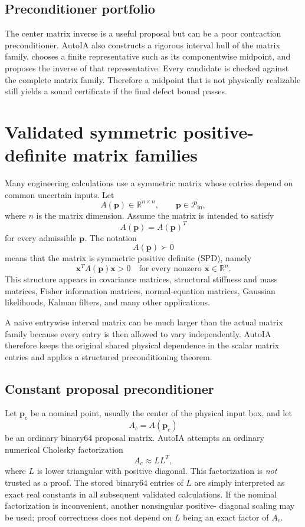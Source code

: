 \documentclass[11pt]{article}
\newcommand{\R}{\mathbb{R}}
\newcommand{\Pin}{\mathcal{P}_{\mathrm{in}}}
\newcommand{\pv}{\mathbf{p}}
\newcommand{\xv}{\mathbf{x}}
\begin{document}
\subsection{Preconditioner portfolio}

The center matrix inverse is a useful proposal but can be a poor contraction
preconditioner.  AutoIA also constructs a rigorous interval hull of the matrix
family, chooses a finite representative such as its componentwise midpoint, and
proposes the inverse of that representative.  Every candidate is checked against
the complete matrix family.  Therefore a midpoint that is not physically
realizable still yields a sound certificate if the final defect bound passes.

\section{Validated symmetric positive-definite matrix families}

Many engineering calculations use a symmetric matrix whose entries depend on
common uncertain inputs.  Let
\[
  A(\pv)\in\R^{n\times n},\qquad \pv\in\Pin,
\]
where \(n\) is the matrix dimension.  Assume the matrix is intended to satisfy
\[
  A(\pv)=A(\pv)^T
\]
for every admissible \(\pv\).  The notation
\[
  A(\pv)\succ0
\]
means that the matrix is symmetric positive definite (SPD), namely
\[
  \xv^T A(\pv)\xv>0
  \quad\text{for every nonzero }\xv\in\R^n.
\]
This structure appears in covariance matrices, structural stiffness and mass
matrices, Fisher information matrices, normal-equation matrices, Gaussian
likelihoods, Kalman filters, and many other applications.

A naive entrywise interval matrix can be much larger than the actual matrix
family because every entry is then allowed to vary independently.  AutoIA
therefore keeps the original shared physical dependence in the scalar matrix
entries and applies a structured preconditioning theorem.

\subsection{Constant proposal preconditioner}

Let \(\pv_c\) be a nominal point, usually the center of the physical input box,
and let
\[
  A_c=A(\pv_c)
\]
be an ordinary binary64 proposal matrix.  AutoIA attempts an ordinary numerical
Cholesky factorization
\[
  A_c\approx L L^T,
\]
where \(L\) is lower triangular with positive diagonal.  This factorization is
\emph{not} trusted as a proof.  The stored binary64 entries of \(L\) are simply
interpreted as exact real constants in all subsequent validated calculations.
If the nominal factorization is inconvenient, another nonsingular positive-
diagonal scaling may be used; proof correctness does not depend on \(L\) being
an exact factor of \(A_c\).
\end{document}

